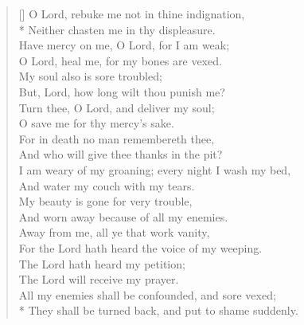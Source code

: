 \documentclass[MAIN]{subfiles}
\begin{document}
\settowidth{\versewidth}{O Lord, rebuke me not in thine indignation,}
\begin{verse}[\versewidth]
O Lord, rebuke me not in thine indignation,\\*
\vin Neither chasten me in thy displeasure.\\
Have mercy on me, O Lord, for I am weak;\\
\vin O Lord, heal me, for my bones are vexed.\\
My soul also is sore troubled;\\
\vin But, Lord, how long wilt thou punish me?\\
Turn thee, O Lord, and deliver my soul;\\
\vin O save me for thy mercy's sake.\\
For in death no man remembereth thee,\\
\vin And who will give thee thanks in the pit?\\
I am weary of my groaning; every night I wash my bed,\\
\vin And water my couch with my tears.\\
My beauty is gone for very trouble,\\
\vin And worn away because of all my enemies.\\
Away from me, all ye that work vanity,\\
\vin For the Lord hath heard the voice of my weeping.\\
The Lord hath heard my petition;\\
\vin The Lord will receive my prayer.\\
All my enemies shall be confounded, and sore vexed;\\*
\vin They shall be turned back, and put to shame suddenly.
\end{verse}
\end{document}
